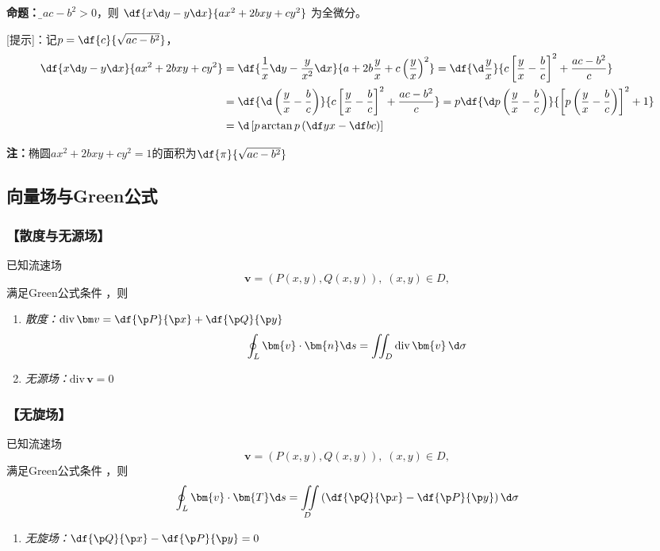 \begin{shaded}
	{\bf 命题：}{\b 若$ac-b^2>0$，则
	$\df{x\d y-y\d x}{ax^2+2bxy+cy^2}$
	为全微分。}
	
	[提示]：记$p=\df{c}{\sqrt{ac-b^2}}$，
	\begin{align*}
		\df{x\d y-y\d x}{ax^2+2bxy+cy^2}
		&=\df{\frac1x\d y-\frac y{x^2}\d x}{a+2b\frac yx+c\left(\frac yx\right)^2}
		=\df{\d\frac yx}{c\left[\frac yx-\frac bc\right]^2+\frac{ac-b^2}{c}}\\
		&=\df{\d\left(\frac yx-\frac bc\right)}{c\left[\frac yx-\frac
		bc\right]^2+\frac{ac-b^2}{c}}
		=p\df{\d p\left(\frac yx-\frac bc\right)}{\left[p\left(\frac yx-\frac
		bc\right)\right]^2+1}\\
		&=\d\left[p\arctan p\left(\df yx-\df bc\right)\right]
	\end{align*}
	
	{\bf 注：}椭圆$ax^2+2bxy+cy^2=1$的面积为$\df{\pi}{\sqrt{ac-b^2}}$
\end{shaded}



\subsection{向量场与Green公式}

\subsubsection{【散度与无源场】}

已知流速场
$$\bm{v}=(P(x,y),Q(x,y)),\;(x,y)\in D,$$
满足Green公式条件 ，则
\begin{enumerate}[(1)]
  \setlength{\itemindent}{1cm}
  \item {\it 散度：}${\mathrm{div}\,\bm v=\df{\p P}{\p x}+\df{\p Q}{\p
  y}}$ 
  $$\oint_L\bm{v}\cdot\bm{n}\d
  s=\iint_D\mathrm{div}\,\bm{v}\,\d\sigma$$
  \item {\it 无源场：}${\mathrm{div}\,\bm{v}=0}$
\end{enumerate}

\subsubsection{【无旋场】}

已知流速场
$$\bm{v}=(P(x,y),Q(x,y)),\;(x,y)\in D,$$
满足Green公式条件 ，则
$$\oint_L\bm{v}\cdot\bm{T}\d s=\iint\limits_D\left(
\df{\p Q}{\p x}-\df{\p P}{\p y}\right)\d\sigma $$
\begin{enumerate}[(1)]
  \setlength{\itemindent}{1cm}
  \addtocounter{enumi}{2}
  \item {\it 无旋场：}${\df{\p Q}{\p x}-\df{\p P}{\p y}=0}$
\end{enumerate}

